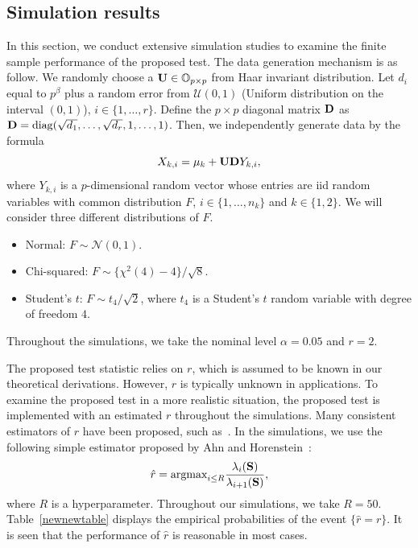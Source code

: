 \documentclass[times,sort&compress,3p]{elsarticle}
\newcommand{\mydiag}{ {\rm diag} }
\theoremstyle{plain}
\theoremstyle{definition}
\theoremstyle{remark}
\begin{document}
\subsection{Simulation results}

In this section, we conduct extensive simulation studies to examine the finite sample performance of the proposed test.
The data generation mechanism is as follow.
We randomly choose a $\mathbf{U}\in\mathbb{O}_{p\times p}$ from Haar invariant distribution.
Let $d_{i}$ equal to $p^{\beta}$ plus a random error from $\mathcal{U}(0,1)$ (Uniform distribution on the interval $(0,1)$), $i\in \{1,\ldots, r \}$.
Define the $p\times p$ diagonal matrix $\mathbf{D}$ as $\BD=\mydiag(\sqrt{d_1},\ldots,\sqrt{d_r}, 1,\ldots, 1)$.
Then, we independently generate data by the formula
$$
X_{k,i}=\mu_k+\mathbf{U} \mathbf{D} Y_{k,i}, 
$$
where $Y_{k,i}$ is a $p$-dimensional random vector whose entries are iid random variables with common distribution $F$,
$i\in\{1,\ldots,n_k\}$ and $k\in\{1,2\}$.
We will consider three different distributions of $F$.
\begin{itemize}
    \item
        Normal: $F \sim \mathcal{N}(0,1)$.
    \item
        Chi-squared:  $F\sim \{\chi^2(4)-4\}/\sqrt{8}$.
    \item
        Student's $t$: $F\sim t_4/\sqrt{2}$, where $t_4$ is a Student's $t$ random variable  with degree of freedom $4$.
\end{itemize}
Throughout the simulations, we take the nominal level $\alpha=0.05$ and $r=2$.


The proposed test statistic relies on $r$, which is assumed to be known in our theoretical derivations.
However, $r$ is typically unknown in applications.
To examine the proposed test in a more realistic situation, the proposed test is implemented with an estimated $r$ throughout the simulations.
Many consistent estimators of $r$ have been proposed, such as~\cite{Ahn2009Eigenvalue,Bai2002,Cai2015Optimal}.
In the simulations, we use the following simple estimator proposed by Ahn and Horenstein~\cite{Ahn2009Eigenvalue}:
\begin{equation}\label{rEstimate}
    \hat{r}=\textrm{argmax}_{i\leq R}\frac{\lambda_i(\mathbf{S})}{\lambda_{i+1}(\mathbf{S})},
\end{equation}
where $R$ is a hyperparameter. Throughout our simulations, we take $R=50$.
Table~\ref{newnewtable} displays the empirical probabilities of the event $\{\hat{r}=r\}$.
It is seen that the performance of $\hat{r}$ is reasonable in most cases.
\end{document}

